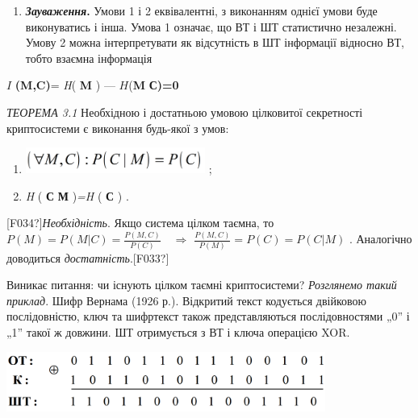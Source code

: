 \liststyleWWviiiNumxliii
\setcounter{saveenum}{\value{enumi}}
\begin{enumerate}
\setcounter{enumi}{\value{saveenum}}
\item \textbf{\textit{Зауваження}}\textbf{.} Умови 1 і 2 еквівалентні, з
виконанням  однієї умови буде виконуватись і інша. Умова 1 означає, що ВТ і ШТ
статистично незалежні. Умову 2 можна інтерпретувати як відсутність в ШТ
інформації відносно ВТ, тобто взаємна інформація  
\end{enumerate}
 $I$\textit{
}\textbf{(}\textbf{M}\textbf{,}\textbf{C}\textbf{)}=\textit{ H}( \textbf{M} ) ---
$H$(\textbf{M} {\textbar} \textbf{С)=0}


\bigskip

\textit{ТЕОРЕМА 3.1 }Необхідною і достатньою умовою цілковитої секретності
криптосистеми є виконання будь-якої  з умов:

\liststyleWWviiiNumxi
\begin{enumerate}
\item 
\includegraphics[width=2.3146in,height=0.3346in]{crypt-img/crypt-img24.png} ;
\item \textit{ H }( \textbf{С}\textbf{ {\textbar} }\textbf{М} )\textit{=H }(
\textbf{С }) .
\end{enumerate}
\textlatin{[F034?]}\textit{Необхідність}. Якщо система цілком таємна, то 
$P(M)=P(M|C)=\frac{P(M,C)}{P(C)}$  $ $ $ $ $\Rightarrow$ 
$\frac{P(M,C)}{P(M)}=P(C)=P(C|M)$ .  Аналогічно доводиться
\textit{достатність}.\textlatin{[F033?]}


\bigskip

Виникає питання: чи існують цілком таємні криптосистеми? \textit{Розглянемо
такий приклад}. Шифр Вернама (1926 р.). Відкритий текст кодується двійковою
послідовністю, ключ та шифртекст  також представляються послідовностями  „0” і
„1” такої ж довжини. ШТ отримується з ВТ і ключа операцією XOR.


\bigskip

 \includegraphics[width=4.111in,height=0.778in]{crypt-img/crypt-img25.png} 


\bigskip

